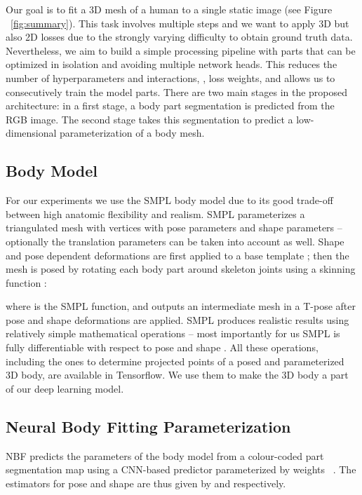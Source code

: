 \documentclass[10pt,twocolumn,letterpaper]{article}
\begin{document}
Our goal is to fit a 3D mesh of a human to a single static image (see Figure ~\ref{fig:summary}). This task involves multiple steps and we want to apply 3D but also 2D losses due to the strongly varying difficulty to obtain ground truth data. Nevertheless, we aim to build a simple processing pipeline with parts that can be optimized in isolation and avoiding multiple network heads. This reduces the number of hyperparameters and interactions, \eg, loss weights, and allows us to consecutively train the model parts. There are two main stages in the proposed architecture: in a first stage, a body part segmentation is predicted from the RGB image. The second stage takes this segmentation to predict a low-dimensional parameterization of a body mesh.\\

\vspace{-1em}

\subsection{Body Model}
\label{subsec:body_model}

For our experiments we use the SMPL body model due to its good trade-off between high anatomic flexibility and realism. SMPL parameterizes a triangulated mesh with  vertices with pose parameters  and shape parameters  -- optionally the translation parameters  can be taken into account as well.
Shape  and pose dependent deformations  are first applied to a base template ; then the mesh is posed by rotating each body part around skeleton joints  using a skinning function :


where  is the SMPL function, and  outputs an intermediate mesh in a T-pose after pose and shape deformations are applied. SMPL produces realistic results using relatively simple mathematical operations -- most importantly for us SMPL is fully differentiable with respect to pose  and shape . All these operations, including the ones to determine projected points of a posed and parameterized 3D body, are available in Tensorflow. We use them to make the 3D body a part of our deep learning model.

\subsection{Neural Body Fitting Parameterization}\label{sec:neural-body-fitting-params}

NBF predicts the parameters of the body model from a colour-coded part segmentation map  using a CNN-based predictor parameterized by weights ~. The estimators for pose and shape are thus given by  and  respectively. 
\end{document}
